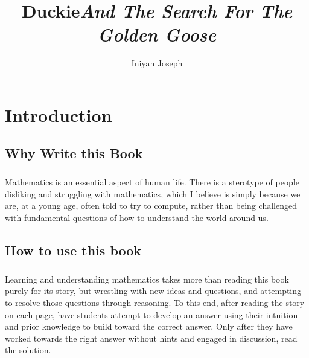 \documentclass[a4paper,11pt ]{book}
\title{\textbf{Duckie}\linebreak \textit{And The Search For The Golden Goose}}
\author{Iniyan Joseph}
\begin{document}
\newcommand{\subchapter}[5]{
\begin{multicols*}{2}
\raggedcolumns
\section{#1}
\vfill
\paragraph*{} #2
\vfill
\paragraph*{} #3
\vfill
\paragraph*{Definition} #4
 \columnbreak
\begin{center}
\vspace*{\fill}
    \texttt{[image: \#5]}
    \vspace*{\fill}
\end{center}
\end{multicols*}
\vfill
\pagebreak
}

\maketitle
\chapter*{Introduction}
\section*{Why Write this Book}
\paragraph*{} Mathematics is an essential aspect of human life. There is a sterotype of people disliking and struggling with mathematics, which I believe is simply because we are, at a young age, often told to try to compute, rather than being challenged with fundamental questions of how to understand the world around us. 
\section*{How to use this book}
\paragraph*{} Learning and understanding mathematics takes more than reading this book purely for its story, but wrestling with new ideas and questions, and attempting to resolve those questions through reasoning. To this end, after reading the story on each page, have students attempt to develop an answer using their intuition and prior knowledge to build toward the correct answer. Only after they have worked towards the right answer without hints and engaged in discussion, read the solution.
\end{document}
